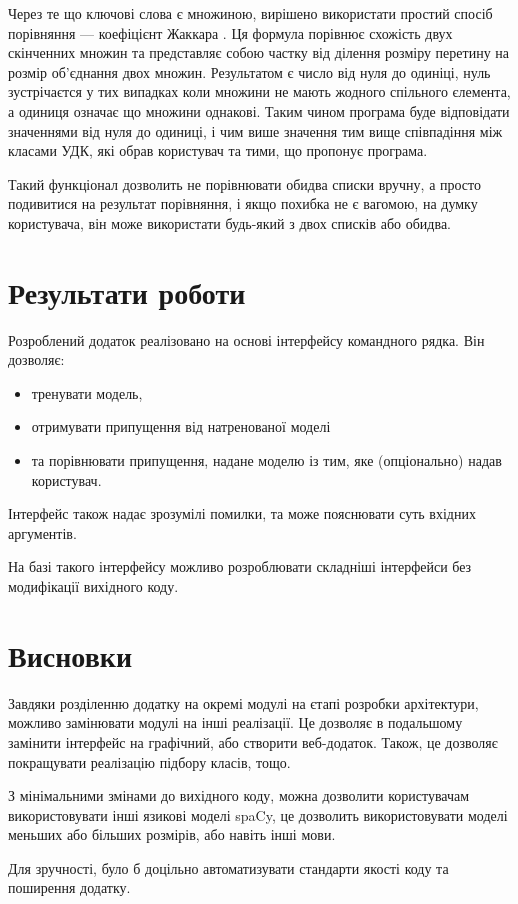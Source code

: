 \documentclass{article}
\let\oldsection\section
\renewcommand{\section}{\clearpage\oldsection}
\begin{document}
  Через те що ключові слова є множиною, вирішено використати простий спосіб
  порівняння --- коефіцієнт Жаккара .
  Ця формула порівнює схожість двух скінченних множин та представляє собою
  частку від ділення розміру перетину 
  на розмір об'єднання  двох множин.
  Результатом є число від нуля до одиніці, нуль зустрічаєтся
  у тих випадках коли множини не мають жодного спільного єлемента,
  а одиниця означає що множини однакові.
  Таким чином програма буде відповідати значеннями від нуля до одиниці,
  і чим више значення тим вище співпадіння між класами УДК,
  які обрав користувач та тими, що пропонує програма.

  Такий функціонал дозволить не порівнювати обидва списки вручну,
  а просто подивитися на результат порівняння, і якщо похибка не є вагомою,
  на думку користувача, він може використати будь-який з двох списків або обидва.

\section{Результати роботи}
Розроблений додаток реалізовано на основі інтерфейсу командного рядка.
Він дозволяє:
\begin{itemize}
  \item тренувати модель,
  \item отримувати припущення від натренованої моделі
  \item та порівнювати припущення, надане моделю із тим, яке (опціонально) надав користувач.
\end{itemize}
Інтерфейс також надає зрозумілі помилки, та може пояснювати суть вхідних аргументів.

На базі такого інтерфейсу можливо розроблювати складніші інтерфейси
без модифікації вихідного коду.

\section{Висновки}
Завдяки розділенню додатку на окремі модулі на єтапі розробки архітектури,
можливо замінювати модулі на інші реалізації.
Це дозволяє в подальшому замінити інтерфейс на графічний, або створити веб-додаток.
Також, це дозволяє покращувати реалізацію підбору класів, тощо.

З мінімальними змінами до вихідного коду, можна дозволити користувачам
використовувати інші язикові моделі spaCy, це дозволить використовувати моделі
меньших або більших розмірів, або навіть інші мови.

Для зручності, було б доцільно автоматизувати стандарти якості
коду та поширення додатку.
\end{document}
